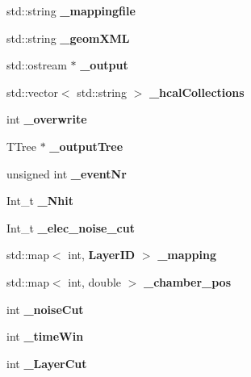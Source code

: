 \begin{DoxyCompactItemize}
\item 
std\-::string {\bfseries \-\_\-mappingfile}\label{classTriventProc_a989b747a0e4e6cfa02d1161a98de421b}

\item 
std\-::string {\bfseries \-\_\-geom\-X\-M\-L}\label{classTriventProc_a7c495692c2aad61a7ce60c749c5bf189}

\item 
std\-::ostream $\ast$ {\bfseries \-\_\-output}\label{classTriventProc_ad38fdb66f027efd6eaac8b638d35f85f}

\item 
std\-::vector$<$ std\-::string $>$ {\bfseries \-\_\-hcal\-Collections}\label{classTriventProc_a741619ec3d58ddd1a9744e9f57ffcb9d}

\item 
int {\bfseries \-\_\-overwrite}\label{classTriventProc_a9d01cd1a1fb76477953a190cc1c96fe8}

\item 
T\-Tree $\ast$ {\bfseries \-\_\-output\-Tree}\label{classTriventProc_ad4554751214a304dec1b09c55fd028d8}

\item 
unsigned int {\bfseries \-\_\-event\-Nr}\label{classTriventProc_afc0951084c600f51cd378430e8b1ed7f}

\item 
Int\-\_\-t {\bfseries \-\_\-\-Nhit}\label{classTriventProc_a6f03092ba886655fe7e6ef2faa6ec522}

\item 
Int\-\_\-t {\bfseries \-\_\-elec\-\_\-noise\-\_\-cut}\label{classTriventProc_a488e31f6481f5681c5286f4ad6bff084}

\item 
std\-::map$<$ int, {\bf Layer\-I\-D} $>$ {\bfseries \-\_\-mapping}\label{classTriventProc_ae9b9a0dd8dbec52b074660676aec5c3a}

\item 
std\-::map$<$ int, double $>$ {\bfseries \-\_\-chamber\-\_\-pos}\label{classTriventProc_a7976ae7b1b03e3b7b7d123d28e52b2c6}

\item 
int {\bfseries \-\_\-noise\-Cut}\label{classTriventProc_a0a1cbdfe614612719c1dd5304e2a60c4}

\item 
int {\bfseries \-\_\-time\-Win}\label{classTriventProc_a7026a2ba0c1c61fbfb14402dc933dfdc}

\item 
int {\bfseries \-\_\-\-Layer\-Cut}\label{classTriventProc_ad24c6960d10afbcef0ed02cfc7e365c7}


\end{DoxyCompactItemize}
